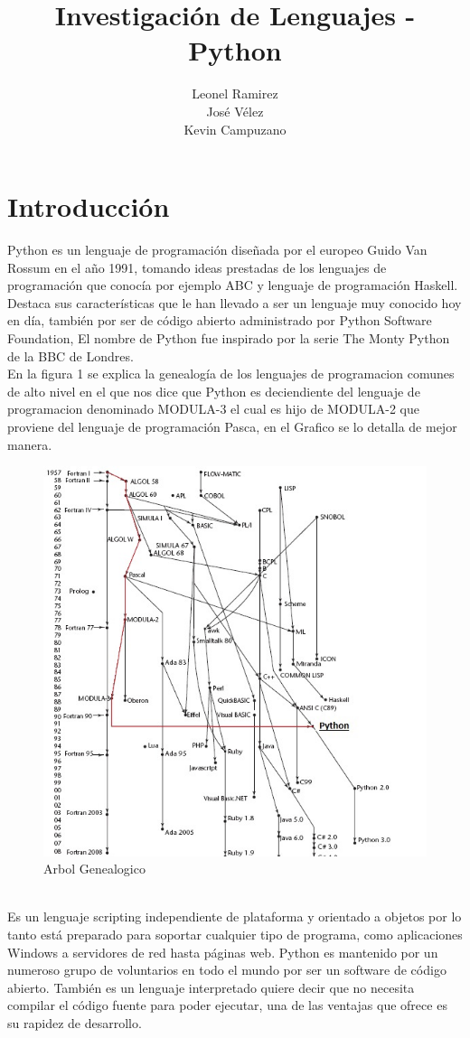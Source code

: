 \documentclass[11pt]{article} %
\title{Investigación de Lenguajes - Python}
\begin{document}
\maketitle
\author{Leonel Ramirez\\José Vélez\\Kevin Campuzano}

\section{Introducción}
Python es un lenguaje de programación diseñada por el europeo Guido Van Rossum en el año 1991, tomando ideas prestadas de los lenguajes de programación que conocía por ejemplo ABC y lenguaje de programación Haskell.
Destaca sus características que le han llevado a ser un lenguaje muy conocido hoy en día, también por ser de código abierto administrado por Python Software Foundation, El nombre de Python fue inspirado por la serie The Monty Python de la BBC de Londres.
\\
En la figura 1 se explica la genealogía de los lenguajes de programacion comunes de alto nivel
en el que nos dice que Python es deciendiente del lenguaje de programacion denominado MODULA-3
el cual es hijo de MODULA-2 que proviene del lenguaje de programación Pasca, en el Grafico se lo detalla
de mejor manera.
\begin{figure}[htbp]
\begin{center}
\includegraphics[width=.40\textwidth]{./imagenes/Arbol.jpg}
\caption{Arbol Genealogico}
\label{Arbol Genealogico}
\end{center}
\end{figure}
\\
Es un lenguaje scripting independiente de plataforma y orientado a objetos  por lo tanto está preparado para soportar cualquier tipo de programa, como aplicaciones Windows a servidores de red hasta páginas web.
Python es mantenido por un numeroso grupo de voluntarios en todo el mundo por ser un software de código abierto.  También es un lenguaje interpretado quiere decir que no necesita compilar el código fuente para poder ejecutar, una de las ventajas que ofrece es su rapidez de desarrollo.
\end{document}
